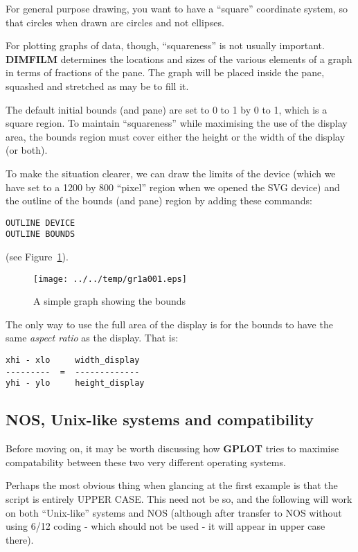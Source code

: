 \documentclass[a4paper,twoside,11pt]{article}
\makeatletter
\def\maxwidth{%
  \ifdim\Gin@nat@width>\linewidth
    \linewidth
  \else
    \Gin@nat@width
  \fi
}
\newcommand{\newpara}{\par\vspace{4mm}\noindent}
\makeatother
\begin{document}
\newpara
For general purpose drawing, you want to have a ``square'' coordinate
system, so that circles when drawn are circles and not ellipses.

\newpara
For plotting graphs of data, though, ``squareness'' is not usually
important. \textbf{DIMFILM} determines the locations and sizes of the various
elements of a graph in terms of fractions of the pane. The graph will be
placed inside the pane, squashed and stretched as may be to fill it.

\newpara
The default initial bounds (and pane) are set to 0 to 1 by 0 to 1, which
is a square region. To maintain ``squareness'' while maximising the use
of the display area, the bounds region must cover either the height or
the width of the display (or both).

\newpara
To make the situation clearer, we can draw the limits of the device
(which we have set to a 1200 by 800 ``pixel'' region when we opened the
SVG device) and the outline of the bounds (and pane) region by adding
these commands:

\begin{lstlisting}
OUTLINE DEVICE
OUTLINE BOUNDS
\end{lstlisting}

\newpara
(see Figure~\ref{fig:gr1a001}).

\begin{figure}
  \centering
  \texttt{[image: ../../temp/gr1a001.eps]}
  \caption{A simple graph showing the bounds}
  \label{fig:gr1a001}
\end{figure}

\newpara
The only way to use the full area of the display is for the bounds to
have the same \emph{aspect ratio} as the display. That is:

\begin{lstlisting}
xhi - xlo     width_display
---------  =  -------------
yhi - ylo     height_display
\end{lstlisting}

\subsection{NOS, Unix-like systems and compatibility}\label{nos-unix-like-systems-and-compatibility}
\newpara
Before moving on, it may be worth discussing how \textbf{GPLOT} tries to maximise
compatability between these two very different operating systems.

\newpara
Perhaps the most obvious thing when glancing at the first example is
that the script is entirely UPPER CASE. This need not be so, and the
following will work on both ``Unix-like'' systems and NOS (although
after transfer to NOS without using 6/12 coding - which should not be
used - it will appear in upper case there).
\end{document}
